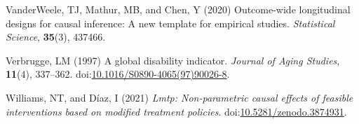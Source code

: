 \documentclass[
  singlecolumn]{article}
\newlength{\cslhangindent}
\newenvironment{CSLReferences}[2] %
 {\begin{list}{}{%
  \setlength{\itemindent}{0pt}
  \setlength{\leftmargin}{0pt}
  \setlength{\parsep}{0pt}
  \ifodd #1
   \setlength{\leftmargin}{\cslhangindent}
   \setlength{\itemindent}{-1\cslhangindent}
  \fi
  \setlength{\itemsep}{#2\baselineskip}}}
 {\end{list}}
\begin{document}
\begin{CSLReferences}{1}{0}
VanderWeele, TJ, Mathur, MB, and Chen, Y (2020) Outcome-wide
longitudinal designs for causal inference: A new template for empirical
studies. \emph{Statistical Science}, \textbf{35}(3), 437466.

Verbrugge, LM (1997) A global disability indicator. \emph{Journal of
Aging Studies}, \textbf{11}(4), 337--362.
doi:\href{https://doi.org/10.1016/S0890-4065(97)90026-8}{10.1016/S0890-4065(97)90026-8}.

Williams, NT, and Díaz, I (2021) \emph{Lmtp: Non-parametric causal
effects of feasible interventions based on modified treatment policies}.
doi:\href{https://doi.org/10.5281/zenodo.3874931}{10.5281/zenodo.3874931}.

\end{CSLReferences}
\end{document}
